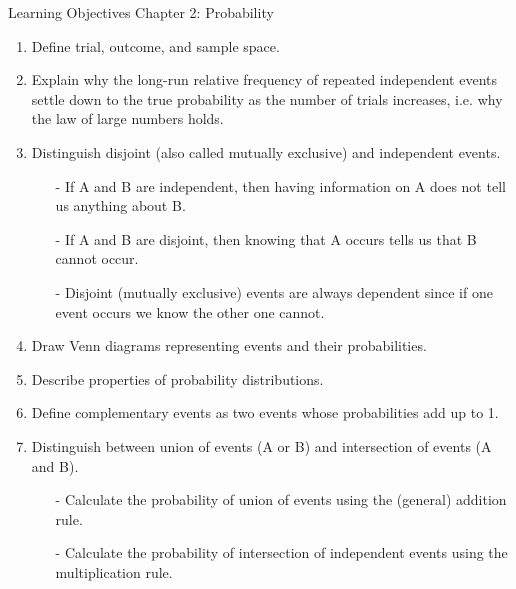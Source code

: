 \documentclass[11pt]{article}
\begin{document}
{\LARGE \textcolor{oiB}{Learning Objectives \hfill Chapter 2: Probability}} \\
\begin{enumerate}
\renewcommand\labelenumi{\textcolor{light}{\textbf{LO \theenumi.}}}

\item Define trial, outcome, and sample space.

\item Explain why the long-run relative frequency of repeated independent events settle down to the true probability as the number of trials increases, i.e. why the law of large numbers holds.

\item Distinguish disjoint (also called mutually exclusive) and independent events.
\begin{itemize}
\item[-] If A and B are independent, then having information on A does not tell us anything about B.
\item[-] If A and B are disjoint, then knowing that A occurs tells us that B cannot occur.
\item[-] Disjoint (mutually exclusive) events are always dependent since if one event occurs we know the other one cannot.
\end{itemize}

\item Draw Venn diagrams representing events and their probabilities.

\item Describe properties of probability distributions.

\item Define complementary events as two events whose probabilities add up to 1.

\item Distinguish between union of events (A or B) and intersection of events (A and B).
\begin{itemize}
\item[-] Calculate the probability of union of events using the (general) addition rule.
\item[-] Calculate the probability of intersection of independent events using the multiplication rule.
\end{itemize}

\end{enumerate}
\end{document}
